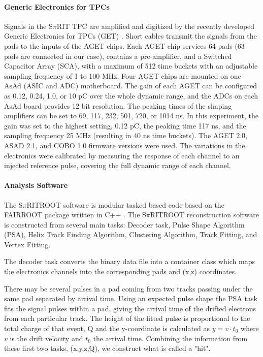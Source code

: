 \documentclass[review]{elsarticle}
\begin{document}
\paragraph{Generic Electronics for TPCs}
Signals in the S$\pi$RIT TPC are amplified and digitized by the recently developed Generic Electronics for TPCs (GET) \cite{get}.  Short cables transmit the signals from the pads to the inputs of the AGET chips. Each AGET chip services 64 pads (63 pads are connected in our case), contains a pre-amplifier, and a Switched Capacitor Array (SCA), with a maximum of 512 time buckets with an adjustable sampling frequency of 1 to 100 MHz. Four AGET chips are mounted on one AsAd (ASIC and ADC) motherboard. The gain of each AGET can be configured as 0.12, 0.24, 1.0, or 10 pC over the whole dynamic range, and the ADCs on each AsAd board provides 12 bit resolution. The peaking times of the shaping amplifiers can be set to 69, 117, 232, 501, 720, or 1014 ns. In this experiment, the gain was set to the highest setting, 0.12 pC, the peaking time 117 ns, and the sampling frequency 25 MHz (resulting in 40 ns time buckets). The AGET 2.0, ASAD 2.1, and COBO 1.0 firmware versions were used. The variations in the electronics were calibrated by measuring the response of each channel to an injected reference pulse, covering the full dynamic range of each channel. 

\paragraph{Analysis Software}
The S$\pi$RITROOT software is modular tasked based code based on the FAIRROOT package written in C++ \cite{fairroot}. The S$\pi$RITROOT reconstruction software is constructed from several main tasks: Decoder task, Pulse Shape Algorithm (PSA), Helix Track Finding Algorithm, Clustering Algorithm, Track Fitting, and Vertex Fitting.

The decoder task converts the binary data file into a container class which maps the electronics channels into the corresponding pads and (x,z) coordinates. 

There may be several pulses in a pad coming from two tracks passing under the same pad separated  by arrival time. Using an expected pulse shape the PSA task fits the signal pulses within a pad, giving the arrival time of the drifted electrons from each particular track. The height of the fitted pulse is proportional to the total charge of that event, Q and the y-coordinate is calculated as $y = v\cdot t_0$ where $v$ is the drift velocity and $t_0$ the arrival time. Combining the information from these first two tasks, (x,y,z,Q), we construct what is called a "hit". 
\end{document}
